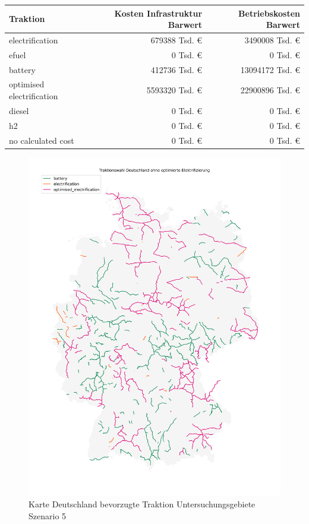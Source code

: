 \begin{center}
	\begin{tabularx}{\textwidth}{X | r | r} Traktion & Kosten Infrastruktur Barwert & Betriebskosten Barwert\\
	\hline
            electrification & \num{679388} Tsd. € &  \num{3490008} Tsd. €\\
            efuel & \num{0} Tsd. € &  \num{0} Tsd. €\\
            battery & \num{412736} Tsd. € &  \num{13094172} Tsd. €\\
            optimised electrification & \num{5593320} Tsd. € &  \num{22900896} Tsd. €\\
            diesel & \num{0} Tsd. € &  \num{0} Tsd. €\\
            h2 & \num{0} Tsd. € &  \num{0} Tsd. €\\
            no calculated cost & \num{0} Tsd. € &  \num{0} Tsd. €\\
    	\end{tabularx}
\end{center}

\begin{center}
	\begin{figure}[p]
	\includegraphics[height=0.8\textheight]{../report_scenarios/s_5/files/deutschland_map}
	\caption{\label{fig_s_5_d_map} Karte Deutschland bevorzugte Traktion Untersuchungsgebiete Szenario 5}
	\end{figure}
\end{center}

